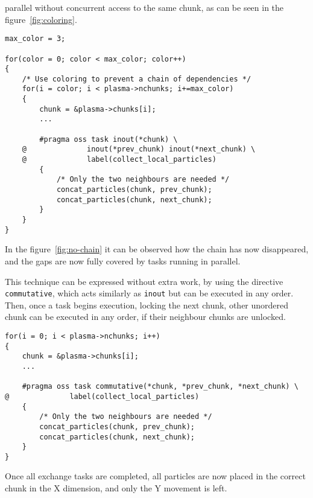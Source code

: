 parallel without concurrent access to the same chunk, as can be seen in the 
figure~\ref{fig:coloring}.
%
\begin{lstlisting}
max_color = 3;

for(color = 0; color < max_color; color++)
{
	/* Use coloring to prevent a chain of dependencies */
	for(i = color; i < plasma->nchunks; i+=max_color)
	{
		chunk = &plasma->chunks[i];
		...

		#pragma oss task inout(*chunk) \
	@              inout(*prev_chunk) inout(*next_chunk) \
	@              label(collect_local_particles)
		{
			/* Only the two neighbours are needed */
			concat_particles(chunk, prev_chunk);
			concat_particles(chunk, next_chunk);
		}
	}
}
\end{lstlisting}
%
In the figure~\ref{fig:no-chain} it can be observed how the chain has now 
disappeared, and the gaps are now fully covered by tasks running in parallel.

This technique can be expressed without extra work, by using the directive 
\texttt{commutative}, which acts similarly as \texttt{inout} but can be executed 
in any order. Then, once a task begins execution, locking the next chunk, other 
unordered chunk can be executed in any order, if their neighbour chunks are 
unlocked.
%
\begin{lstlisting}
for(i = 0; i < plasma->nchunks; i++)
{
	chunk = &plasma->chunks[i];
	...

	#pragma oss task commutative(*chunk, *prev_chunk, *next_chunk) \
@              label(collect_local_particles)
	{
		/* Only the two neighbours are needed */
		concat_particles(chunk, prev_chunk);
		concat_particles(chunk, next_chunk);
	}
}
\end{lstlisting}
%
Once all exchange tasks are completed, all particles are now placed in the 
correct chunk in the X dimension, and only the Y movement is left.

